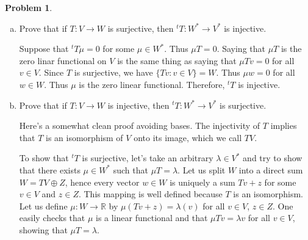 \documentclass[11pt,oneside]{amsart}
\theoremstyle{definition}
\newtheorem{problem}{Problem}
\newcommand{\bR}{\mathbb{R}}
\begin{document}
    \begin{problem}
        \leavevmode\begin{enumerate}[(a)]
            \item Prove that if $T\colon V\to W$ is surjective, then $^tT\colon W^*\to V^*$ is injective.
            \begin{solution}
                Suppose that $^tT\mu=0$ for some $\mu\in W^*$. Thus $\mu T=0$. Saying that $\mu T$ is the zero linar functional on $V$ is the same thing as saying that $\mu Tv=0$ for all $v\in V$. Since $T$ is surjective, we have $\{Tv:v\in V\}=W$. Thus $\mu w=0$ for all $w\in W$. Thus $\mu$ is the zero linear functional. Therefore, $^tT$ is injective.
            \end{solution}
            \item Prove that if $T\colon V\to W$ is injective, then $^tT\colon W^*\to V^*$ is surjective.
            \begin{solution}
                Here's a somewhat clean proof avoiding bases. The injectivity of $T$ implies that $T$ is an isomorphism of $V$ onto its image, which we call $TV$.

                To show that $^tT$ is surjective, let's take an arbitrary $\lambda\in V^*$ and try to show that there exists $\mu\in W^*$ such that $\mu T=\lambda$. Let us split $W$ into a direct sum $W=TV\oplus Z$, hence every vector $w\in W$ is uniquely a sum $Tv+z$ for some $v\in V$ and $z\in Z$. This mapping is well defined because $T$ is an isomorphism. Let us define $\mu\colon W\to\bR$ by $\mu(Tv+z)=\lambda(v)$ for all $v\in V$, $z\in Z$. One easily checks that $\mu$ is a linear functional and that $\mu Tv=\lambda v$ for all $v\in V$, showing that $\mu T=\lambda$.


\end{solution}
\end{enumerate}
\end{problem}
\end{document}
